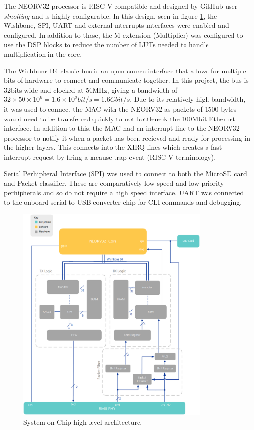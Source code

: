 The NEORV32 processor is RISC-V compatible and designed by GitHub user \textit{stnolting} and is highly configurable. In this design, seen in figure \ref{fig:soc_architecture}, the Wishbone, SPI, UART and external interrupts interfaces were enabled and configured. In addition to these, the M extension (Multiplier) was configured to use the DSP blocks to reduce the number of LUTs needed to handle multiplication in the core. 

The Wishbone B4 classic bus is an open source interface that allows for multiple bits of hardware to connect and communicate together. In this project, the bus is 32bits wide and clocked at 50MHz, giving a bandwidth of $32 \times 50 \times 10^6 = 1.6\times 10^9bit/s=1.6Gbit/s$. Due to its relatively high bandwidth, it was used to connect the MAC with the NEORV32 as packets of 1500 bytes would need to be transferred quickly to not bottleneck the 100Mbit Ethernet interface. In addition to this, the MAC had an interrupt line to the NEORV32 processor to notify it when a packet has been recieved and ready for processing in the higher layers. This connects into the XIRQ lines which creates a fast interrupt request by firing a mcause trap event (RISC-V terminology).

Serial Perhipheral Interface (SPI) was used to connect to both the MicroSD card and Packet classifier. These are comparatively low speed and low priority perhipherals and so do not require a high speed interface. UART was connected to the onboard serial to USB converter chip for CLI commands and debugging. 



\begin{figure}[h]
    \centering
    \includegraphics[width=0.85\textwidth]{Images/SoCArchitecture.png}
    \caption[System on Chip high level architecture]{System on Chip high level architecture.}
    \label{fig:soc_architecture}
\end{figure}

